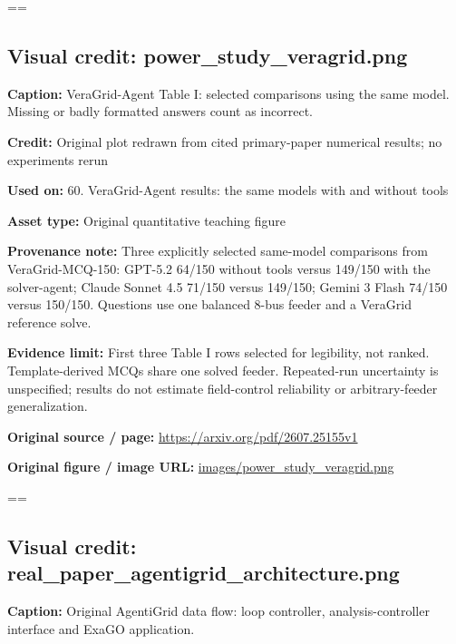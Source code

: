 \documentclass[10pt,letterpaper]{article}
\begin{document}
\egroup\par\noindent\box\readingEntry\par\medskip
\setbox\readingEntry=\vbox\bgroup\hsize=\linewidth\subsection*{Visual credit: power\_study\_veragrid.png}
\textbf{Caption:} VeraGrid-Agent Table I: selected comparisons using the same model. Missing or badly formatted answers count as incorrect.\par
\textbf{Credit:} Original plot redrawn from cited primary-paper numerical results; no experiments rerun\par
\textbf{Used on:} 60. VeraGrid-Agent results: the same models with and without tools\par
\textbf{Asset type:} Original quantitative teaching figure\par
\textbf{Provenance note:} Three explicitly selected same-model comparisons from VeraGrid-MCQ-150: GPT-5.2 64/150 without tools versus 149/150 with the solver-agent; Claude Sonnet 4.5 71/150 versus 149/150; Gemini 3 Flash 74/150 versus 150/150. Questions use one balanced 8-bus feeder and a VeraGrid reference solve.\par
\textbf{Evidence limit:} First three Table I rows selected for legibility, not ranked. Template-derived MCQs share one solved feeder. Repeated-run uncertainty is unspecified; results do not estimate field-control reliability or arbitrary-feeder generalization.\par
\textbf{Original source / page:} \href{https://arxiv.org/pdf/2607.25155v1}{\small\ttfamily https:/\allowbreak{}/\allowbreak{}arxiv.\allowbreak{}org/\allowbreak{}pdf/\allowbreak{}2607.\allowbreak{}25155v1}\par
\textbf{Original figure / image URL:} \href{images/power_study_veragrid.png}{\small\ttfamily images/\allowbreak{}power\_\allowbreak{}study\_\allowbreak{}veragrid.\allowbreak{}png}\par
\egroup\par\noindent\box\readingEntry\par\medskip
\setbox\readingEntry=\vbox\bgroup\hsize=\linewidth\subsection*{Visual credit: real\_paper\_agentigrid\_architecture.png}
\textbf{Caption:} Original AgentiGrid data flow: loop controller, analysis-controller interface and ExaGO application.\par
\end{document}
